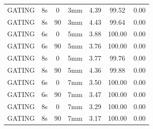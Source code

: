 \documentclass[type=dr, dr=rernat, accentcolor=tud7b,colorbacktitle, bigchapter, openright, twoside, 12pt ]{tudthesis}
\begin{document}
\begin{table}[H]
\begin{tabular}{|c||c|c|c||c|c|c|}
GATING & 8s & 0 & 3mm & 4.39 & 99.52 & 0.00 \\
GATING & 8s & 90 & 3mm & 4.43 & 99.64 & 0.00 \\
GATING & 6s & 0 & 5mm & 3.88 & 100.00 & 0.00 \\
GATING & 6s & 90 & 5mm & 3.76 & 100.00 & 0.00 \\
GATING & 8s & 0 & 5mm & 3.77 & 99.76 & 0.00 \\
GATING & 8s & 90 & 5mm & 4.36 & 99.88 & 0.00 \\
GATING & 6s & 0 & 7mm & 3.50 & 100.00 & 0.00 \\
GATING & 6s & 90 & 7mm & 3.47 & 100.00 & 0.00 \\
GATING & 8s & 0 & 7mm & 3.29 & 100.00 & 0.00 \\
GATING & 8s & 90 & 7mm & 3.17 & 100.00 & 0.00 \\
    \hline\hline 
  \end{tabular}
\end{table}

\newpage
\end{document}
